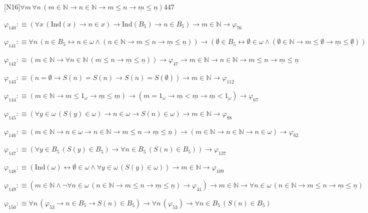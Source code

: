 \begin{fullproof}{[N16]}{$\forall m\,\forall n\,(m \in \mathbb{N} \to n \in \mathbb{N} \to m \leq n \to \underline{m} \leq \underline{n})$}{447}
\begin{abbrevlist}
\item $\varphi_{140} :\equiv (\forall x\,(\mathrm{Ind}(x) \to n \in x) \to \mathrm{Ind}(B_{5}) \to n \in B_{5}) \to m \in \mathbb{N} \to \varphi_{76}$
\item $\varphi_{141} :\equiv \forall n\,(n \in B_{5} \leftrightarrow n \in \omega \land (n \in \mathbb{N} \to m \leq n \to \underline{m} \leq \underline{n})) \to (\emptyset \in B_{5} \leftrightarrow \emptyset \in \omega \land (\emptyset \in \mathbb{N} \to m \leq \emptyset \to \underline{m} \leq \underline{\emptyset}))$
\item $\varphi_{142} :\equiv (m \in \mathbb{N} \to \forall n \in \mathbb{N}\,(m \leq n \to \underline{m} \leq \underline{n})) \to \varphi_{47} \to m \in \mathbb{N} \to n \in \mathbb{N} \to m \leq n \to \underline{m} \leq \underline{n}$
\item $\varphi_{143} :\equiv (n = \emptyset \to S(n) = S(n) \to S(n) = S(\emptyset)) \to m \in \mathbb{N} \to \varphi_{112}$
\item $\varphi_{144} :\equiv (m \in \mathbb{N} \to m \leq 1_{\omega} \to \underline{m} \leq \underline{m}) \to (m = 1_{\omega} \to \underline{m} < \underline{m} \to \underline{m} < \underline{1_{\omega}}) \to \varphi_{67}$
\item $\varphi_{145} :\equiv (\forall y \in \omega\,(S(y) \in \omega) \to n \in \omega \to S(n) \in \omega) \to m \in \mathbb{N} \to \varphi_{88}$
\item $\varphi_{146} :\equiv (m \in \mathbb{N} \to n \in \omega \to n \in \mathbb{N} \to m \leq n \to \underline{m} \leq \underline{n}) \to (m \in \mathbb{N} \to n \in \mathbb{N} \to n \in \omega) \to \varphi_{62}$
\item $\varphi_{147} :\equiv (\forall y \in B_{5}\,(S(y) \in B_{5}) \to \forall n \in B_{5}\,(S(n) \in B_{5})) \to \varphi_{137}$
\item $\varphi_{148} :\equiv (\mathrm{Ind}(\omega) \leftrightarrow \emptyset \in \omega \land \forall y \in \omega\,(S(y) \in \omega)) \to m \in \mathbb{N} \to \varphi_{109}$
\item $\varphi_{149} :\equiv (m \in \mathbb{N} \land \neg \forall n \in \omega\,(n \in \mathbb{N} \to m \leq n \to \underline{m} \leq \underline{n}) \to \varphi_{41}) \to m \in \mathbb{N} \to \forall n \in \omega\,(n \in \mathbb{N} \to m \leq n \to \underline{m} \leq \underline{n})$
\item $\varphi_{150} :\equiv \forall n\,(\varphi_{53} \to n \in B_{5} \to S(n) \in B_{5}) \to \forall n\,(\varphi_{53}) \to \forall n \in B_{5}\,(S(n) \in B_{5})$

\end{abbrevlist}
\end{fullproof}
